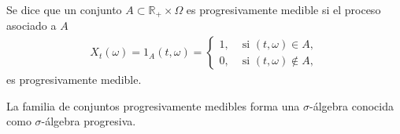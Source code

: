 \begin{definition}
	Se dice que un conjunto $A \subset \mathbb{R}_{+} \times \Omega$ es progresivamente medible si el proceso asociado a $A$
	\begin{align*}
	X_t(\omega) = 1_A (t, \omega) =
	\begin{cases}
	1, & \text{ si } (t, \omega) \in A, \\
	0, & \text{ si } (t, \omega) \notin A,
	\end{cases}
	\end{align*}
	es progresivamente medible.
\end{definition}

\begin{proposition}
	La familia de conjuntos progresivamente medibles forma una $\sigma$-álgebra conocida como $\sigma$-álgebra progresiva.
\end{proposition}
